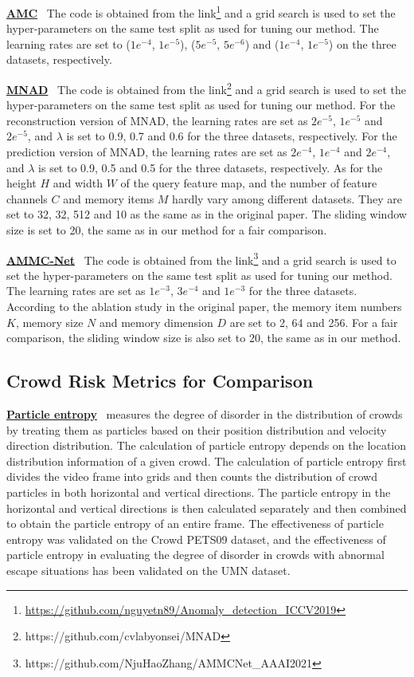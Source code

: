 \documentclass[journal]{IEEEtran}
\begin{document}
\vskip 0.03in
\noindent \underline{\textbf{AMC}}~\cite{nguyen2019anomaly}
The code is obtained from the link\footnote{\url{https://github.com/nguyetn89/Anomaly_detection_ICCV2019}} and a grid search is used to set the hyper-parameters on the same test split as used for tuning our method. The learning rates are set to ($1e^{-4}$, $1e^{-5}$), ($5e^{-5}$, $5e^{-6}$) and ($1e^{-4}$, $1e^{-5}$) on the three datasets, respectively.

\vskip 0.03in
\noindent \underline{\textbf{MNAD}}~\cite{park2020learning}
The code is obtained from the link\footnote{https://github.com/cvlab\-yonsei/MNAD} and a grid search is used to set the hyper-parameters on the same test split as used for tuning our method. For the reconstruction version of MNAD, the learning rates are set as $2e^{-5}$, $1e^{-5}$ and $2e^{-5}$, and $\lambda$ is set to 0.9, 0.7 and 0.6 for the three datasets, respectively. For the prediction version of MNAD, the learning rates are set as $2e^{-4}$, $1e^{-4}$ and $2e^{-4}$, and $\lambda$ is set to 0.9, 0.5 and 0.5 for the three datasets, respectively. As for the height $H$ and width $W$ of the query feature map, and the number of feature channels $C$ and memory items $M$ hardly vary among different datasets. They are set to 32, 32, 512 and 10 as the same as in the original paper. The sliding window size is set to 20, the same as in our method for a fair comparison.

\vskip 0.03in
\noindent \underline{\textbf{AMMC-Net}}~\cite{cai2021appearance}
The code is obtained from the link\footnote{https://github.com/NjuHaoZhang/AMMCNet\_AAAI2021} and a grid search is used to set the hyper-parameters on the same test split as used for tuning our method. The learning rates are set as $1e^{-3}$, $3e^{-4}$ and $1e^{-3}$ for the three datasets. According to the ablation study in the original paper, the memory item numbers $K$, memory size $N$ and memory dimension $D$ are set to 2, 64 and 256. For a fair comparison, the sliding window size is also set to 20, the same as in our method.


\vskip -0.03in
\thispagestyle{empty}
\subsection{Crowd Risk Metrics for Comparison}\label{appendix:riskmetrics}
\vskip -0.03in
\noindent \underline{\textbf{Particle entropy}}~\cite{gu2014abnormal} measures the degree of disorder in the distribution of crowds by treating them as particles based on their position distribution and velocity direction distribution. The calculation of particle entropy depends on the location distribution information of a given crowd. The calculation of particle entropy first divides the video frame into grids and then counts the distribution of crowd particles in both horizontal and vertical directions. The particle entropy in the horizontal and vertical directions is then calculated separately and then combined to obtain the particle entropy of an entire frame. The effectiveness of particle entropy was validated on the Crowd PETS09 dataset, and the effectiveness of particle entropy in evaluating the degree of disorder in crowds with abnormal escape situations has been validated on the UMN dataset.
\end{document}
